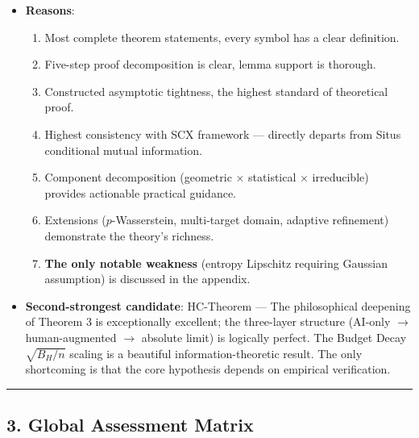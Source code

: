 \documentclass[
  12pt,
]{article}
\providecommand{\tightlist}{%
  \setlength{\itemsep}{0pt}\setlength{\parskip}{0pt}}
\begin{document}
\begin{itemize}
\tightlist
\item
  \textbf{Reasons}:
  \begin{enumerate}
  \def\labelenumi{\arabic{enumi}.}
  \tightlist
  \item
    Most complete theorem statements, every symbol has a clear definition.
  \item
    Five-step proof decomposition is clear, lemma support is thorough.
  \item
    Constructed asymptotic tightness, the highest standard of theoretical proof.
  \item
    Highest consistency with SCX framework --- directly departs from Situs conditional mutual information.
  \item
    Component decomposition (geometric $\times$ statistical $\times$ irreducible) provides actionable practical guidance.
  \item
    Extensions ($p$-Wasserstein, multi-target domain, adaptive refinement) demonstrate the theory's richness.
  \item
    \textbf{The only notable weakness} (entropy Lipschitz requiring Gaussian assumption) is discussed in the appendix.
  \end{enumerate}
\item
  \textbf{Second-strongest candidate}: HC-Theorem --- The philosophical deepening of Theorem 3 is exceptionally excellent; the three-layer structure (AI-only $\to$ human-augmented $\to$ absolute limit) is logically perfect. The Budget Decay $\sqrt{B_H/n}$ scaling is a beautiful information-theoretic result. The only shortcoming is that the core hypothesis depends on empirical verification.
\end{itemize}

\begin{center}\rule{0.5\linewidth}{0.5pt}\end{center}

\subsection{3. Global Assessment Matrix}\label{global-assessment-matrix}
\end{document}
